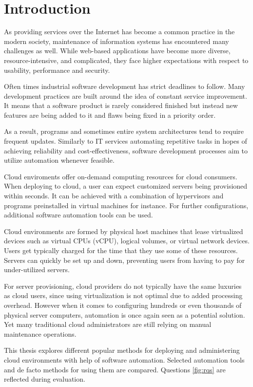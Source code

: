 \chapter{Introduction}

As providing services over the Internet has become a common practice in the
modern society, maintenance of information systems has encountered many
challenges as well. While web-based applications have become more diverse,
resource-intensive, and complicated, they face higher expectations with respect
to usability, performance and security.

Often times industrial software development has strict deadlines to follow.
Many development practices are built around the idea of constant service
improvement. It means that a software product is rarely considered finished but
instead new features are being added to it and flaws being fixed in a priority
order.

As a result, programs and sometimes entire system architectures tend to require
frequent updates. Similarly to IT services automating repetitive tasks in hopes
of achieving reliability and cost-effectiveness, software development processes
aim to utilize automation whenever feasible.

Cloud enviroments offer on-demand computing resources for cloud consumers. When
deploying to cloud, a user can expect customized servers being provisioned
within seconds. It can be achieved with a combination of hypervisors and
programs preinstalled in virtual machines for instance. For further
configurations, additional software automation tools can be used.

Cloud environments are formed by physical host machines that lease virtualized
devices such as virtual CPUs (vCPU), logical volumes, or virtual network
devices. Users get typically charged for the time that they use some of these
resources. Servers can quickly be set up and down, preventing users from
having to pay for under-utilized servers.

For server provisioning, cloud providers do not typically have the same
luxuries as cloud users, since using virtualization is not optimal due to added
processing overhead. However when it comes to configuring hundreds or even
thousands of physical server computers, automation is once again seen as a
potential solution. Yet many traditional cloud administrators are still relying
on manual maintenance operations.

This thesis explores different popular methods for deploying and administering
cloud environments with help of software automation. Selected automation tools
and de facto methods for using them are compared. Questions \ref{fig:rqs} are
reflected during evaluation.

